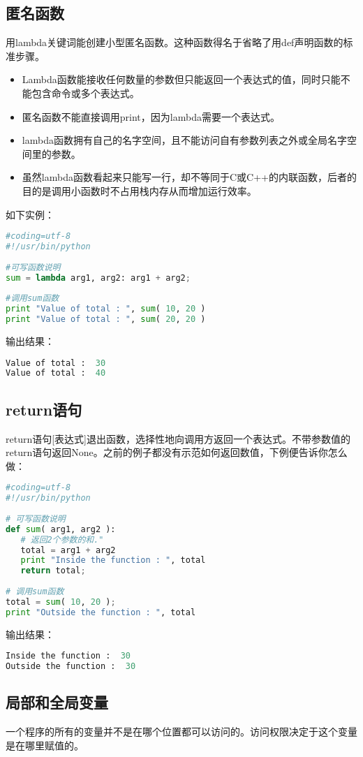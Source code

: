 \subsection{匿名函数}
用lambda关键词能创建小型匿名函数。这种函数得名于省略了用def声明函数的标准步骤。
\begin{itemize}
\item Lambda函数能接收任何数量的参数但只能返回一个表达式的值，同时只能不能包含命令或多个表达式。
\item 匿名函数不能直接调用print，因为lambda需要一个表达式。
\item lambda函数拥有自己的名字空间，且不能访问自有参数列表之外或全局名字空间里的参数。
\item 虽然lambda函数看起来只能写一行，却不等同于C或C++的内联函数，后者的目的是调用小函数时不占用栈内存从而增加运行效率。
\end{itemize}
如下实例：
\begin{lstlisting}[language=Python]
#coding=utf-8
#!/usr/bin/python
 
#可写函数说明
sum = lambda arg1, arg2: arg1 + arg2;
 
#调用sum函数
print "Value of total : ", sum( 10, 20 )
print "Value of total : ", sum( 20, 20 )
\end{lstlisting}
输出结果：
\begin{lstlisting}[language=Python]
Value of total :  30
Value of total :  40
\end{lstlisting}


\subsection{return语句}
return语句[表达式]退出函数，选择性地向调用方返回一个表达式。不带参数值的return语句返回None。之前的例子都没有示范如何返回数值，下例便告诉你怎么做：
\begin{lstlisting}[language=Python]
#coding=utf-8
#!/usr/bin/python
 
# 可写函数说明
def sum( arg1, arg2 ):
   # 返回2个参数的和."
   total = arg1 + arg2
   print "Inside the function : ", total
   return total;
 
# 调用sum函数
total = sum( 10, 20 );
print "Outside the function : ", total 
\end{lstlisting}
输出结果：
\begin{lstlisting}[language=Python]
Inside the function :  30
Outside the function :  30
\end{lstlisting}


\subsection{局部和全局变量}
一个程序的所有的变量并不是在哪个位置都可以访问的。访问权限决定于这个变量是在哪里赋值的。

